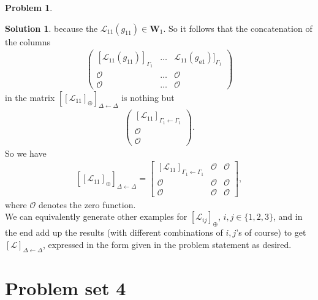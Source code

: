 \documentclass{book}
\theoremstyle{definition}
\newtheorem*{prob*}{Problem}
\newtheorem*{sln*}{Solution}
\newcommand{\W}{\mathbf{W}}
\newcommand{\lag}{\mathcal{L}}
\begin{document}
\begin{prob*}
\begin{sln*}
	because the $\lag_{11}(g_{11}) \in \W_1$. So it follows that the concatenation of the columns 
	\begin{align*}
	\begin{pmatrix}
	[\lag_{11}(g_{11})]_{\Gamma_1} &\dots & \lag_{11}(g_{a1})]_{\Gamma_1}
	\\ \mathcal{O} & \dots & \mathcal{O}
	\\ \mathcal{O} & \dots & \mathcal{O}
	\end{pmatrix}
	\end{align*}
	in the matrix $\left[[\lag_{11}]_\oplus\right]_{\Delta\leftarrow\Delta}$ is nothing but 
	\begin{align*}
	\begin{pmatrix}
	[\lag_{11}]_{\Gamma_1\leftarrow\Gamma_1} \\ \mathcal{O} \\ \mathcal{O}
	\end{pmatrix}.
	\end{align*}
	So we have
	\begin{align*}
	\left[[\lag_{11}]_\oplus\right]_{\Delta\leftarrow\Delta} = \begin{bmatrix}
	[\lag_{11}]_{\Gamma_1\leftarrow\Gamma_1} & \mathcal{O} & \mathcal{O}\\
	\mathcal{O} & \mathcal{O} & \mathcal{O}\\
	\mathcal{O} & \mathcal{O} & \mathcal{O}
	\end{bmatrix},
	\end{align*}
	where $\mathcal{O}$ denotes the zero function.\\
	
	We can equivalently generate other examples for $[\lag_{ij}]_\oplus$, $i,j\in \{1,2,3\}$, and in the end add up the results (with different combinations of $i,j$'s of course) to get $[\lag]_{\Delta\leftarrow\Delta}$, expressed in the form given in the problem statement as desired.  
	\end{sln*}
\end{prob*}







\newpage




\section{Problem set 4}
\end{document}
